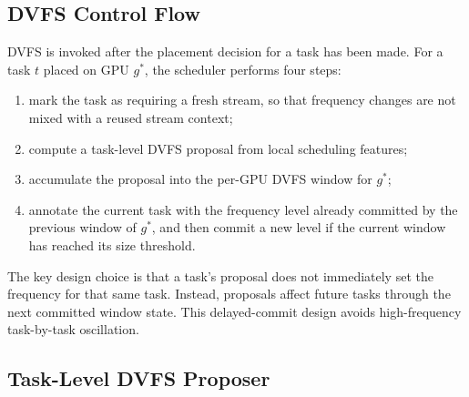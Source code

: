 \subsection{DVFS Control Flow}
\label{subsec:methods-dvfs-control-flow}

DVFS is invoked after the placement decision for a task has been made. For a task $t$ placed on GPU $g^{*}$, the scheduler performs four steps:
\begin{enumerate}
\item mark the task as requiring a fresh stream, so that frequency changes are not mixed with a reused stream context;
\item compute a task-level DVFS proposal from local scheduling features;
\item accumulate the proposal into the per-GPU DVFS window for $g^{*}$;
\item annotate the current task with the frequency level already committed by the previous window of $g^{*}$, and then commit a new level if the current window has reached its size threshold.
\end{enumerate}

The key design choice is that a task's proposal does not immediately set the frequency for that same task. Instead, proposals affect future tasks through the next committed window state. This delayed-commit design avoids high-frequency task-by-task oscillation.

\subsection{Task-Level DVFS Proposer}
\label{subsec:methods-dvfs-proposer}


